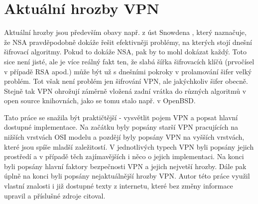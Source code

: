 \documentclass[thesis=B,czech]{FITthesis}[2012/06/26]
\begin{document}
  \section{Aktuální hrozby VPN}

    Aktuální hrozby jsou především obavy např. z úst Snowdena \cite{snowden}, který naznačuje, že NSA pravděpodobně dokáže řešit efektivněji problémy, na kterých stojí dnešní šifrovací algoritmy. Pokud to dokáže NSA, pak by to mohl dokázat každý. Toto sice není jisté,
    ale je více reálný fakt ten, že slabá šířka šifrovacích klíčů (prvočísel v případě RSA apod.) může být už s dnešními pokroky v prolamování šifer velký problém. \cite{short_key} Tot však není problém jen šifrování VPN, ale jakýchkoliv šifer obecně. Stejně tak VPN
    ohrožují záměrně vložená zadní vrátka do různých algoritmů v open source knihovnách, jako se tomu stalo např. v OpenBSD.\cite{openbsd}

\begin{conclusion}
  Tato práce se snažila být praktičtější - vysvětlit pojem VPN a popsat hlavní dostupné implementace. Na začátku byly popsány starší VPN pracujících na nižších vrstvách OSI modelu a pozdějí byly popsány VPN na vyšších vrstvách, které jsou spíše mladší zaležitostí. V jednotlivých typech VPN byli popsány jejich prostředí a v případě těch zajímavějších i něco o jejich implementaci.
  Na konci byli popsány hlavní faktory bezpečnosti VPN a jejich nejvetší hrozby. Dále pak úplně na konci byli popsány nejaktuálnější hrozby VPN. Autor této práce využil vlastní znalosti i již dostupné texty z internetu, které bez změny informace upravil a příslušné zdroje citoval.
\end{conclusion}




\appendix
\end{document}
